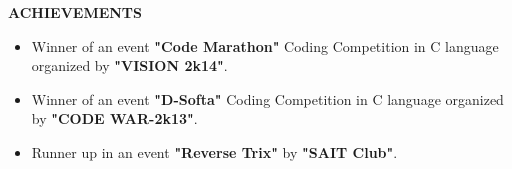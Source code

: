 \documentclass{article}
\begin{document}
\begin{comment}
	

\begin{framed}
	\large{\textbf{WORKSHOP ATTENDED}}
\end{framed}

\begin{itemize}
	\item Attended workshop on \textbf{"Hadoop Basics"} in March 2015 by "Mr. Kapil Bhosale".
	\item Attended workshop on \textbf{"Ruby on rails Workshop"} by Sushant Mane.
	\item Attended workshop on \textbf{"Clean Coding and Object Oriented Design"} by \textbf{"Thaughtworks"}. 
\end{itemize}


\vspace{1cm}
\begin{framed}
	\large{\textbf{CO-CURRICULAR ACTIVITIES}}
\end{framed}
\begin{itemize}
	\item Winner in \textbf{"Code Marathon"} in \textbf{"Vision 2014"}.
	\item Runner up in \textbf{"Code Trix"}  by \textbf{ "SAIT Club"}.
\end{itemize}


\vspace{1cm}
\end{comment}


\begin{minipage}{\textwidth}
	\begin{framed}
		\large{\textbf{ACHIEVEMENTS}}
	\end{framed} 
	\begin{comment}
	\large{\textbf{\setlength{\parindent}{15pt}
			\indent Coding Competitions}}\\
	\end{comment}
	\begin{itemize}
		\item Winner of an event \textbf{"Code Marathon"} Coding Competition in C language organized by \textbf{"VISION 2k14"}.
		\item Winner of an event \textbf{"D-Softa"} Coding Competition in C language organized by \textbf{"CODE WAR-2k13"}.
		\item Runner up in an event \textbf{"Reverse Trix"}  by \textbf{ "SAIT Club"}.
		
	\end{itemize}
\end{minipage}
\end{document}
